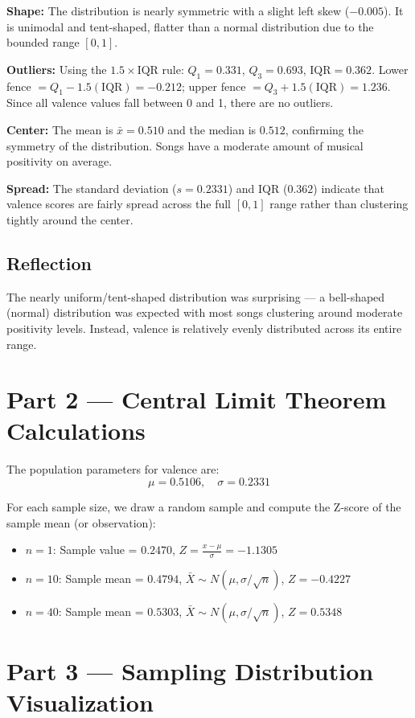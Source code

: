 \documentclass[12pt]{article}
\begin{document}
\textbf{Shape:} The distribution is nearly symmetric with a slight left skew ($-0.005$). It is unimodal and tent-shaped, flatter than a normal distribution due to the bounded range $[0, 1]$.

\textbf{Outliers:} Using the $1.5 \times \text{IQR}$ rule: $Q_1 = 0.331$, $Q_3 = 0.693$, $\text{IQR} = 0.362$. Lower fence $= Q_1 - 1.5(\text{IQR}) = -0.212$; upper fence $= Q_3 + 1.5(\text{IQR}) = 1.236$. Since all valence values fall between 0 and 1, there are no outliers.

\textbf{Center:} The mean is $\bar{x} = 0.510$ and the median is $0.512$, confirming the symmetry of the distribution. Songs have a moderate amount of musical positivity on average.

\textbf{Spread:} The standard deviation ($s = 0.2331$) and IQR ($0.362$) indicate that valence scores are fairly spread across the full $[0, 1]$ range rather than clustering tightly around the center.

\subsection*{Reflection}
The nearly uniform/tent-shaped distribution was surprising — a bell-shaped (normal) distribution was expected with most songs clustering around moderate positivity levels. Instead, valence is relatively evenly distributed across its entire range.

\section*{Part 2 — Central Limit Theorem Calculations}

The population parameters for valence are:
\[
\mu = 0.5106, \quad \sigma = 0.2331
\]

For each sample size, we draw a random sample and compute the Z-score of the sample mean (or observation):

\begin{itemize}
    \item $n = 1$: Sample value = $0.2470$, $Z = \frac{x - \mu}{\sigma} = -1.1305$
    \item $n = 10$: Sample mean = $0.4794$, $\bar{X} \sim N(\mu, \sigma/\sqrt{n})$, $Z = -0.4227$
    \item $n = 40$: Sample mean = $0.5303$, $\bar{X} \sim N(\mu, \sigma/\sqrt{n})$, $Z = 0.5348$
\end{itemize}

\section*{Part 3 — Sampling Distribution Visualization}
\end{document}
